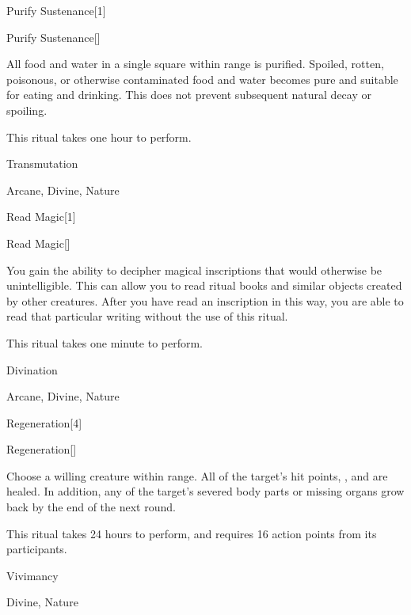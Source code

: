 \begin{spellsection}{Purify Sustenance}[1]


\begin{ability}{Purify Sustenance}[]

All food and water in a single square within \rngclose range is purified.
Spoiled, rotten, poisonous, or otherwise contaminated food and water becomes pure and suitable for eating and drinking.
This does not prevent subsequent natural decay or spoiling.

This ritual takes one hour to perform.

\end{ability}




 Transmutation

 Arcane, Divine, Nature
\end{spellsection}


\begin{spellsection}{Read Magic}[1]


\begin{ability}{Read Magic}[]

You gain the ability to decipher magical inscriptions that would otherwise be unintelligible.
This can allow you to read ritual books and similar objects created by other creatures.
After you have read an inscription in this way, you are able to read that particular writing without the use of this ritual.

This ritual takes one minute to perform.

\end{ability}




 Divination

 Arcane, Divine, Nature
\end{spellsection}


\begin{spellsection}{Regeneration}[4]


\begin{ability}{Regeneration}[]

Choose a willing creature within \rngclose range.
All of the target's hit points, , and  are healed.
In addition, any of the target's severed body parts or missing organs grow back by the end of the next round.

This ritual takes 24 hours to perform, and requires 16 action points from its participants.

\end{ability}




 Vivimancy

 Divine, Nature
\end{spellsection}


